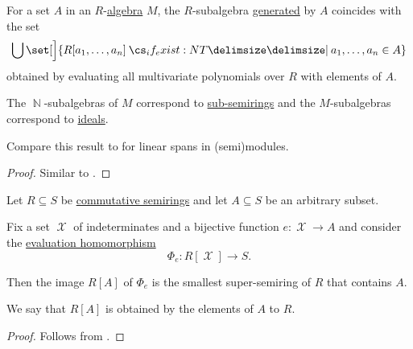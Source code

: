 \begin{proposition}\label{thm:generators_via_polynomials}
  For a set \( A \) in an \( R \)-\hyperref[def:algebra_over_semiring]{algebra} \( M \), the \( R \)-subalgebra \hyperref[def:algebra_over_semiring/generated]{generated} by \( A \) coincides with the set
  \begin{equation*}
    \bigcup \set[\Big]{ R[a_1, \ldots, a_n] \given* a_1, \ldots, a_n \in A }
  \end{equation*}
  obtained by evaluating all multivariate polynomials over \( R \) with elements of \( A \).
\end{proposition}
\begin{comments}
  \item The \( \BbbN \)-subalgebras of \( M \) correspond to \hyperref[def:semiring/submodel]{sub-semirings} and the \( M \)-subalgebras correspond to \hyperref[def:semiring_ideal]{ideals}.

  \item Compare this result to  for linear spans in (semi)modules.
\end{comments}
\begin{proof}
  Similar to .
\end{proof}

\begin{proposition}\label{thm:adjoining_elements_to_semiring}
  Let \( R \subseteq S \) be \hyperref[def:semiring/commutative]{commutative semirings} and let \( A \subseteq S \) be an arbitrary subset.

  Fix a set \( \mscrX \) of indeterminates and a bijective function \( e: \mscrX \to A \) and consider the \hyperref[rem:substitution_homomorphism]{evaluation homomorphism}
  \begin{equation*}
    \Phi_e: R[\mscrX] \to S.
  \end{equation*}

  Then the image \( R[A] \) of \( \Phi_e \) is the smallest super-semiring of \( R \) that contains \( A \).

  We say that \( R[A] \) is obtained by  the elements of \( A \) to \( R \).
\end{proposition}
\begin{proof}
  Follows from .
\end{proof}

